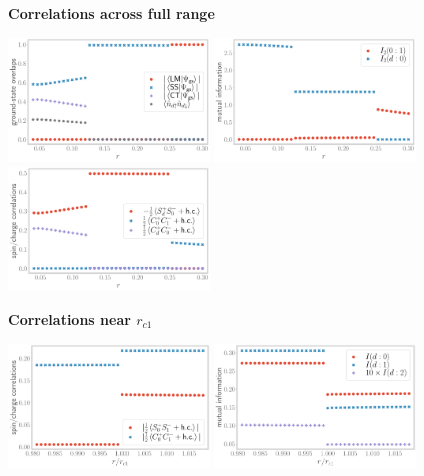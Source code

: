 \documentclass{revtex4-2}
\begin{document}
{\bf Correlations across full range}\par\noindent
\includegraphics[width=0.4\textwidth]{corrs_gs.pdf}
\includegraphics[width=0.4\textwidth]{mutinfo-d0-01-full.pdf}\\
\includegraphics[width=0.4\textwidth]{spin-charge-corr-full.pdf}

{\bf Correlations near \(r_{c1}\)}\par\noindent
\includegraphics[width=0.4\textwidth]{Uc1-spin-charge-01.pdf}
\includegraphics[width=0.4\textwidth]{Uc1-mutinfo.pdf}
\end{document}
